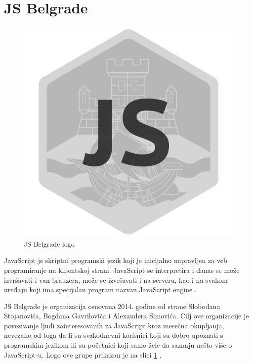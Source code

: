 \documentclass[a4paper]{article}
\begin{document}
{%

\section{JS Belgrade}
\label{sec:JSBM}

\begin{figure}[H]
\begin{center}
\includegraphics[scale=0.25]{JS_logo.png}
\end{center}
\caption{JS Belgrade logo}
\label{fig:JS_slika}
\end{figure}

JavaScript je skriptni programski jezik koji je inicijalno napravljen za veb programiranje na klijentskoj strani. JavaScript se interpretira i danas se može izvršavati i van brauzera, može se izvršavati i na serveru, kao i na svakom uređaju koji ima specijalan program nazvan JavaScript engine \cite{aboutJS}. 

JS Belgrade je organizacija osnovana 2014. godine od strane Slobodana Stojanovića, Bogdana Gavrilovića i Alexandera Simovića. Cilj ove organizacije je povezivanje ljudi zainteresovanih za JavaScript kroz mesečna okupljanja, nevezano od toga da li su svakodnevni korisnici koji su dobro upoznati s programskim jezikom ili su početnici koji samo žele da saznaju nešto više o JavaScript-u. Logo ove grupe prikazan je na slici \ref{fig:JS_slika} \cite{JS_Belgrade_meetup_pocetna}.

}
\end{document}
